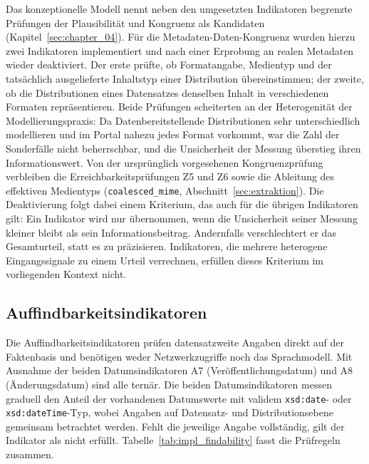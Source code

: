 Das konzeptionelle Modell nennt neben den umgesetzten Indikatoren begrenzte
Prüfungen der Plausibilität und Kongruenz als Kandidaten (Kapitel~\ref{sec:chapter_04}).
Für die Metadaten-Daten-Kongruenz wurden hierzu zwei Indikatoren implementiert
und nach einer Erprobung an realen Metadaten wieder deaktiviert. Der erste prüfte,
ob Formatangabe, Medientyp und der tatsächlich ausgelieferte Inhaltstyp einer
Distribution übereinstimmen; der zweite, ob die Distributionen eines Datensatzes
denselben Inhalt in verschiedenen Formaten repräsentieren. Beide Prüfungen
scheiterten an der Heterogenität der Modellierungspraxis: Da Datenbereitstellende
Distributionen sehr unterschiedlich modellieren und im Portal nahezu jedes Format
vorkommt, war die Zahl der Sonderfälle nicht beherrschbar, und die Unsicherheit
der Messung überstieg ihren Informationswert. Von der ursprünglich vorgesehenen
Kongruenzprüfung verbleiben die Erreichbarkeitsprüfungen Z5 und Z6 sowie die
Ableitung des effektiven Medientyps (\texttt{coalesced\_mime},
Abschnitt~\ref{sec:extraktion}). Die Deaktivierung folgt dabei einem Kriterium, das
auch für die übrigen Indikatoren gilt: Ein Indikator wird nur übernommen, wenn die
Unsicherheit seiner Messung kleiner bleibt als sein Informationsbeitrag.
Andernfalls verschlechtert er das Gesamturteil, statt es zu präzisieren.
Indikatoren, die mehrere heterogene Eingangssignale zu einem Urteil verrechnen,
erfüllen dieses Kriterium im vorliegenden Kontext nicht.

\subsection{Auffindbarkeitsindikatoren}

Die Auffindbarkeitsindikatoren prüfen datensatzweite Angaben direkt auf der Faktenbasis und benötigen weder Netzwerkzugriffe noch das Sprachmodell. Mit Ausnahme der beiden Datumsindikatoren A7 (Veröffentlichungsdatum) und A8 (Änderungsdatum) sind alle ternär. Die beiden Datumsindikatoren messen graduell den Anteil der vorhandenen Datumswerte mit validem \texttt{xsd:date}- oder \texttt{xsd:dateTime}-Typ, wobei Angaben auf Datensatz- und Distributionsebene gemeinsam betrachtet werden. Fehlt die jeweilige Angabe vollständig, gilt der Indikator als nicht erfüllt. Tabelle~\ref{tab:impl_findability} fasst die Prüfregeln zusammen.

